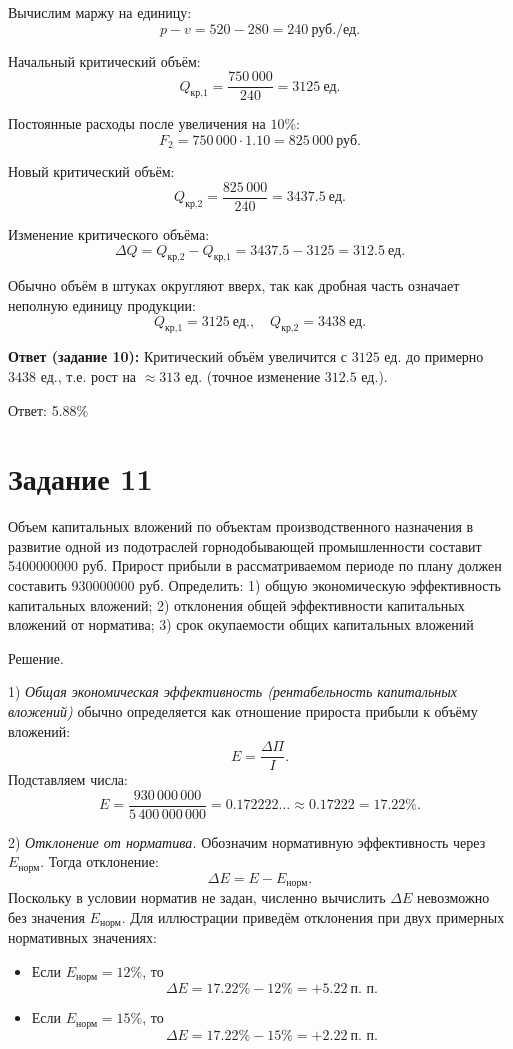 \documentclass[14pt,a4paper]{extarticle}
\begin{document}
Вычислим маржу на единицу:
\[
p-v=520-280=240\ \text{руб./ед.}
\]

Начальный критический объём:
\[
Q_{\text{кр,1}}=\frac{750\,000}{240}=3125\ \text{ед.}
\]

Постоянные расходы после увеличения на $10\%$:
\[
F_2=750\,000\cdot 1.10=825\,000\ \text{руб.}
\]

Новый критический объём:
\[
Q_{\text{кр,2}}=\frac{825\,000}{240}=3437.5\ \text{ед.}
\]

Изменение критического объёма:
\[
\Delta Q = Q_{\text{кр,2}}-Q_{\text{кр,1}} = 3437.5-3125 = 312.5\ \text{ед.}
\]

Обычно объём в штуках округляют вверх, так как дробная часть означает неполную единицу продукции:
\[
Q_{\text{кр,1}}=3125\ \text{ед.},\quad Q_{\text{кр,2}}=3438\ \text{ед.}
\]

\textbf{Ответ (задание 10):}
Критический объём увеличится с $3125$ ед. до примерно $3438$ ед., т.е. рост на $\approx 313$ ед. (точное изменение $312.5$ ед.).

Ответ: 5.88\%

\section{Задание 11}
Объем капитальных вложений по объектам производственного назначения в
развитие одной из подотраслей горнодобывающей промышленности составит 5400000000
руб. Прирост прибыли в рассматриваемом периоде по плану должен составить 930000000
руб.
Определить:
1) общую экономическую эффективность капитальных вложений;
2) отклонения общей эффективности капитальных вложений от норматива;
3) срок окупаемости общих капитальных вложений

Решение.

1) \textit{Общая экономическая эффективность (рентабельность капитальных вложений)} обычно определяется как отношение
прироста прибыли к объёму вложений:
\[
E = \frac{\Delta\Pi}{I}.
\]
Подставляем числа:
\[
E = \frac{930\,000\,000}{5\,400\,000\,000} = 0.172222\ldots \approx 0.17222 = 17.22\%.
\]

2) \textit{Отклонение от норматива.} Обозначим нормативную эффективность через \(E_{\text{норм}}\). Тогда отклонение:
\[
\Delta E = E - E_{\text{норм}}.
\]
Поскольку в условии норматив не задан, численно вычислить \(\Delta E\) невозможно без значения \(E_{\text{норм}}\).
Для иллюстрации приведём отклонения при двух примерных нормативных значениях:

\begin{itemize}
  \item Если \(E_{\text{норм}}=12\%\), то
  \[
  \Delta E = 17.22\% - 12\% = +5.22\ \text{п. п.}
  \]
  \item Если \(E_{\text{норм}}=15\%\), то
  \[
  \Delta E = 17.22\% - 15\% = +2.22\ \text{п. п.}
  \]
\end{itemize}
\end{document}
